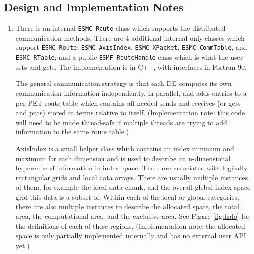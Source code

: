 

\subsection{Design and Implementation Notes}
\label{sec:routeimpl}

\begin{enumerate}

\item

There is an internal {\tt ESMC\_Route} class which supports the 
distributed communication methods.  There are 4 additional internal-only
classes which support {\tt ESMC\_Route}: {\tt ESMC\_AxisIndex}, 
{\tt ESMC\_XPacket}, {\tt ESMC\_CommTable}, and {\tt ESMC\_RTable};
and a public {\tt ESMF\_RouteHandle} class which is what the user 
sets and gets.  The implementation is in C++, with interfaces in Fortran 90.

The general communication strategy is that each
DE computes its own communication information independently,
in parallel, and adds entries to a per-PET route table
which contains all needed sends and receives (or gets and puts) 
stored in terms relative to itself.  (Implementation note: this
code will need to be made thread-safe if multiple threads are
trying to add information to the same route table.)

AxisIndex is a small helper class which contains an index minimum
and maximum for each dimension and is used to describe an n-dimensional
hypercube of information in index space.  These are associated with 
logically rectangular grids and local data arrays.  
There are usually multiple instances of them, for example the local
data chunk, and the overall global index-space grid this data is
a subset of.  Within each of the local or global categories, there are
also multiple instances to describe the allocated space, the total area,
the computational area, and the exclusive area.  See Figure \ref{fig:halo}
for the definitions of each of these regions.
(Implementation note: the allocated space is only partially implemented
internally and has no external user API yet.)


\end{enumerate}
